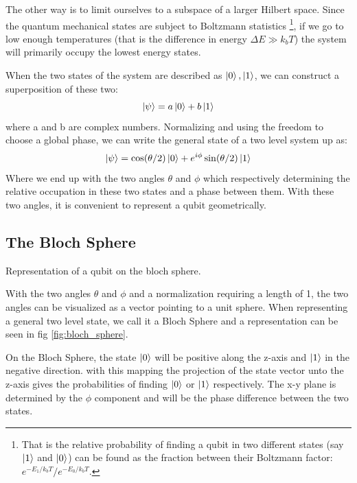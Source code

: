 The other way is to limit ourselves to a subspace of a larger Hilbert space. Since the quantum mechanical states are subject to Boltzmann statistics \footnote{That is the relative probability of finding a qubit in two different states (say $\ket{1}$ and $\ket{0}$) can be found as the fraction between their Boltzmann factor: $e^{-E_1 / k_b  T} / e^{- E_0 / k_b  T}$.}, if we go to low enough temperatures (that is the difference in energy $\Delta E \gg k_b T$)  the system will primarily occupy the lowest energy states. 

When the two states of the system are described as $\ket{0}, \ket{1}$, we can construct a superposition of these two:
\begin{equation}
    \ket{\psi} = a \ket{0} + b \ket{1}
\end{equation}
where a and b are complex numbers. Normalizing and using the freedom to choose a global phase, we can write the general state of a two level system up as:
\begin{equation}\label{eq:general_2_state}
    \ket{\psi} = \cos (\theta / 2) \ket{0} + e^{i\phi}\sin(\theta / 2)\ket{1}
\end{equation}
Where we end up with the two angles $\theta$ and $\phi$ which respectively determining the relative occupation in these two states and a phase between them. With these two angles, it is convenient to represent a qubit geometrically.

\subsection{The Bloch Sphere}
\begin{marginfigure}[3 cm]
    \centering
    \caption{Representation of a qubit on the bloch sphere.}
    \label{fig:bloch_sphere}
\end{marginfigure}
With the two angles $\theta$ and $\phi$ and a normalization requiring a length of 1, the two angles can be visualized as a vector pointing to a unit sphere. When representing a general two level state, we call it a Bloch Sphere and a representation can be seen in fig \ref{fig:bloch_sphere}.

On the Bloch Sphere, the state $\ket{0}$ will be positive along the z-axis and $\ket{1}$ in the negative direction. with this mapping the projection of the state vector unto the z-axis gives the probabilities of finding $\ket{0}$ or $\ket{1}$ respectively. The x-y plane is determined by the $\phi$ component and will be the phase difference between the two states. \cite{BlochSphere}


